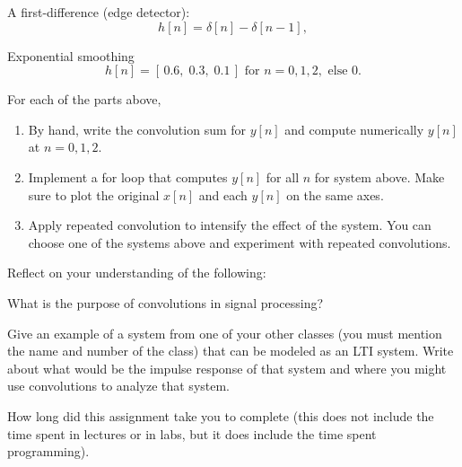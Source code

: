 \documentclass{ee102_pset}
\begin{document}
\problempart [12 points] A first-difference (edge detector):
\[
h[n]=\delta[n]-\delta[n-1],
\]

\problempart [12 points] Exponential smoothing
\[
h[n]=[\,0.6,\;0.3,\;0.1\,]\text{ for }n=0,1,2, \text{ else }0.
\]

For each of the parts above, 
\begin{enumerate}
  \item By hand, write the convolution sum for $y[n]$ and compute numerically $y[n]$ at $n=0,1,2$.
  \item Implement a for loop that computes $y[n]$ for all $n$ for system above. Make sure to plot the original $x[n]$ and each $y[n]$ on the same axes.
  \item Apply repeated convolution to intensify the effect of the system. You can choose one of the systems above and experiment with repeated convolutions.
\end{enumerate}


Reflect on your understanding of the following:

\problempart [1 point] What is the purpose of convolutions in signal processing?

\problempart [2 point] Give an example of a system from one of your other classes (you must mention the name and number of the class) that can be modeled as an LTI system. Write about what would be the impulse response of that system and where you might use convolutions to analyze that system.

\problempart [1 point] How long did this assignment take you to complete (this does not include the time spent in lectures or in labs, but it does include the time spent programming).
\end{document}
